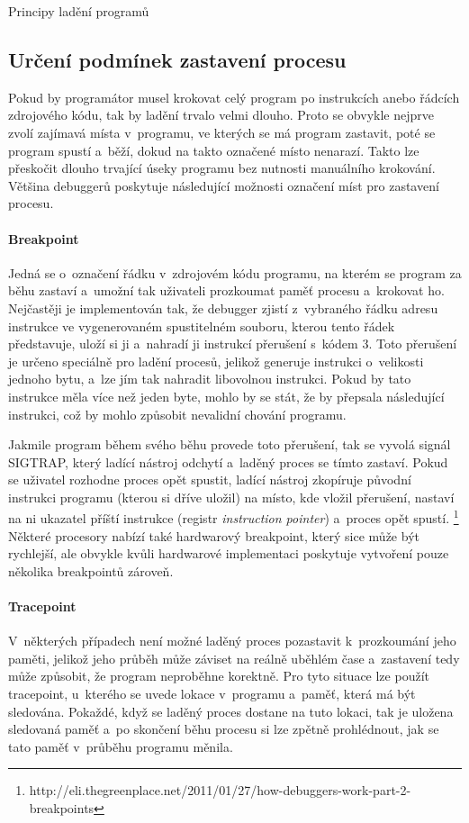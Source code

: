 \documentclass[czech,bachelor,male,python,dept460,hidelinks]{diploma}						%
\newcommand{\parspace}[1][]{
	\ifthenelse{\isempty{#1}}{\vspace{0mm}}{\vspace{#1}}
	\par
}
\begin{document}
\begin{section}{Principy ladění programů}
	\subsection{Určení podmínek zastavení procesu}
		Pokud by programátor musel krokovat celý program po instrukcích anebo řádcích zdrojového kódu, tak by ladění trvalo velmi dlouho.
		Proto se obvykle nejprve zvolí zajímavá místa v~programu, ve kterých se má program zastavit, poté se program spustí a~běží, dokud na takto označené místo
		nenarazí. Takto lze přeskočit dlouho trvající úseky programu bez nutnosti manuálního krokování. Většina debuggerů poskytuje následující možnosti označení
		míst pro zastavení procesu.
		
		\paragraph*{Breakpoint}
			Jedná se o~označení řádku v~zdrojovém kódu programu, na kterém se program za běhu zastaví a~umožní tak uživateli prozkoumat paměť procesu a~krokovat ho.
			Nejčastěji je implementován tak, že debugger zjistí z~vybraného řádku adresu instrukce ve vygenerovaném spustitelném souboru, kterou tento
			řádek představuje, uloží si ji a~nahradí ji instrukcí přerušení s~kódem 3. Toto přerušení je určeno speciálně pro ladění procesů, jelikož generuje
			instrukci o~velikosti jednoho bytu, a~lze jím tak nahradit libovolnou instrukci. \cite[306]{intel} Pokud by tato instrukce měla více než jeden byte,
			mohlo by se stát, že by přepsala následující instrukci, což by mohlo způsobit nevalidní chování programu.
			
			\parspace Jakmile program během svého běhu
			provede toto přerušení, tak se vyvolá signál SIGTRAP, který ladící nástroj odchytí a~laděný proces se tímto zastaví. Pokud se uživatel rozhodne proces
			opět spustit, ladící nástroj zkopíruje původní instrukci programu (kterou si dříve uložil) na místo, kde vložil přerušení, nastaví na ni ukazatel
			příští instrukce (registr \textit{instruction pointer}) a~proces opět spustí.
			\footnote{http://eli.thegreenplace.net/2011/01/27/how-debuggers-work-part-2-breakpoints}
			Některé procesory nabízí také hardwarový breakpoint, který sice může být rychlejší, ale obvykle kvůli hardwarové implementaci poskytuje
			vytvoření pouze několika breakpointů zároveň.
		\paragraph*{Tracepoint}
			V~některých případech není možné laděný proces pozastavit k~prozkoumání jeho paměti, jelikož jeho průběh může záviset na reálně uběhlém čase a~zastavení
			tedy může způsobit, že program neproběhne korektně. Pro tyto situace lze použít tracepoint, u~kterého se uvede lokace v~programu a~paměť, která má být
			sledována. Pokaždé, když se laděný proces dostane na tuto lokaci, tak je uložena sledovaná paměť a~po skončení běhu procesu si lze zpětně prohlédnout,
			jak se tato paměť v~průběhu programu měnila.

\end{section}
\end{document}
